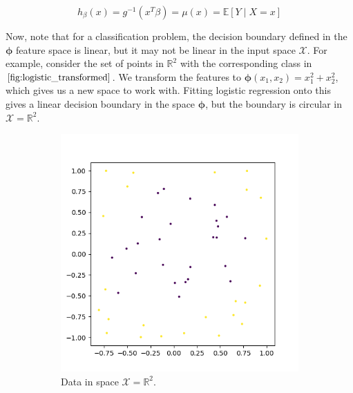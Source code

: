 \documentclass{article}
\theoremstyle{definition}
\theoremstyle{remark}
\theoremstyle{definition}
\begin{document}
    \[h_\beta (x) = g^{-1} (x^T \beta) = \mu(x) = \mathbb{E}[Y \mid X = x]\]

    Now, note that for a classification problem, the decision boundary defined in the $\boldsymbol{\phi}$ feature space is linear, but it may not be linear in the input space $\mathcal{X}$. For example, consider the set of points in $\mathbb{R}^2$ with the corresponding class in $\ref{fig:logistic_transformed}$. We transform the features to $\boldsymbol{\phi}(x_1, x_2) = x_1^2 + x_2^2$, which gives us a new space to work with. Fitting logistic regression onto this gives a linear decision boundary in the space $\boldsymbol{\phi}$, but the boundary is circular in $\mathcal{X} = \mathbb{R}^2$. 

    \begin{figure}[hbt!]
      \centering
      \begin{subfigure}[b]{0.35\textwidth}
      \centering
        \includegraphics[width=\textwidth]{Images/logistic/untrans_data.png}
        \caption{Data in space $\mathcal{X} = \mathbb{R}^2$. }
        \label{fig:raw_points}
      \end{subfigure}
      \begin{subfigure}[b]{0.35\textwidth}
      \centering

\end{subfigure}
\end{figure}
\end{document}
